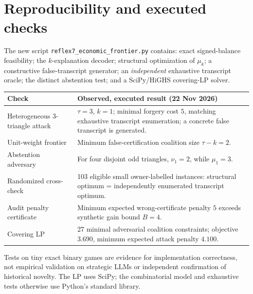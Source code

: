 \documentclass[10pt,a4paper]{article}
\begin{document}
\section{Reproducibility and executed checks}
The new script \texttt{reflex7\_economic\_frontier.py} contains: exact signed-balance feasibility; the $k$-explanation decoder; structural optimization of $\mu_k$; a constructive false-transcript generator; an \emph{independent} exhaustive transcript oracle; the distinct abstention test; and a SciPy/HiGHS covering-LP solver.\par
\begin{center}\small
\begin{tabularx}{\linewidth}{@{}p{.37\linewidth}X@{}}\toprule
\textbf{Check} & \textbf{Observed, executed result (22 Nov 2026)}\\\midrule
Heterogeneous 3-triangle attack & $\tau=3$, $k=1$; minimal forgery cost $5$, matching exhaustive transcript enumeration; a concrete false transcript is generated.\\
Unit-weight frontier & Minimum false-certification coalition size $\tau-k=2$.\\
Abstention adversary & For four disjoint odd triangles, $\nu_1=2$, while $\mu_1=3$.\\
Randomized cross-check & 103 eligible small owner-labelled instances: structural optimum = independently enumerated transcript optimum.\\
Audit penalty certificate & Minimum expected wrong-certificate penalty $5$ exceeds synthetic gain bound $B=4$.\\
Covering LP & 27 minimal adversarial coalition constraints; objective $3.690$, minimum expected attack penalty $4.100$.\\\bottomrule
\end{tabularx}
\end{center}
Tests on tiny exact binary games are evidence for implementation correctness, not empirical validation on strategic LLMs or independent confirmation of historical novelty. The LP uses SciPy; the combinatorial model and exhaustive tests otherwise use Python's standard library.
\end{document}
